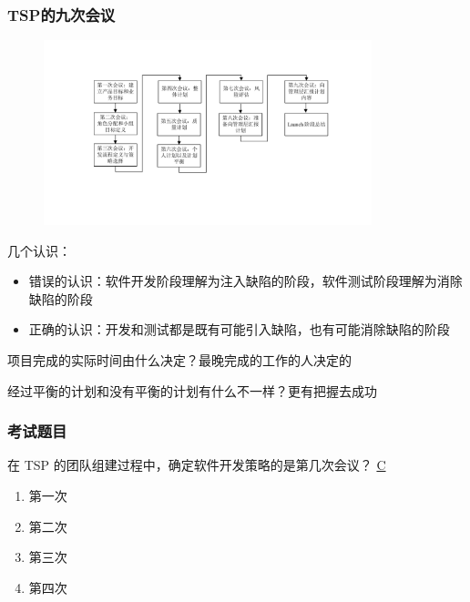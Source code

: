 \subsubsection{TSP的九次会议}
\begin{figure}[H]
    \vspace{-0.5em}
	\centering
	\includegraphics[width=0.85\textwidth]{images/TSP的九次会议.pdf}
    \vspace{-1em}
\end{figure}
几个认识：
\begin{itemize}
    \item 错误的认识：软件开发阶段理解为注入缺陷的阶段，软件测试阶段理解为消除缺陷的阶段
    \item 正确的认识：开发和测试都是既有可能引入缺陷，也有可能消除缺陷的阶段
\end{itemize}

项目完成的实际时间由什么决定？最晚完成的工作的人决定的

经过平衡的计划和没有平衡的计划有什么不一样？更有把握去成功

\subsubsection{考试题目}
\begin{problem}
	在 TSP 的团队组建过程中，确定软件开发策略的是第几次会议？
	\uline{C}    
    \vspace{-0.8em}
    \begin{multicols}{4}
        \begin{enumerate}[label=\Alph*.]
            \item 第一次
            \item 第二次
            \item 第三次
            \item 第四次
        \end{enumerate}
    \end{multicols}
    \vspace{-1em}
\end{problem}

